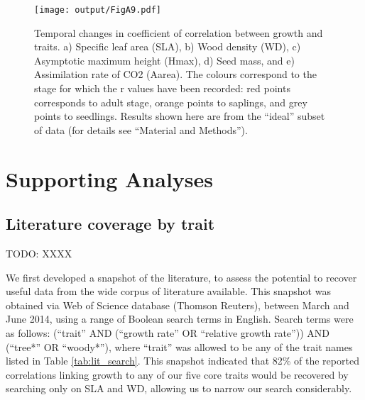 \documentclass[a4paper,11pt]{article}
\begin{document}
\begin{appendices}
\begin{figure}[h!]
\centering
\texttt{[image: output/FigA9.pdf]}
\caption{Temporal changes in coefficient of correlation between growth and traits. a) Specific leaf area (SLA), b) Wood density (WD), c) Asymptotic maximum height (Hmax), d) Seed mass, and e) Assimilation rate of CO2 (Aarea). The colours correspond to the stage for which the r values have been recorded: red points corresponds to adult stage, orange points to saplings, and grey points to seedlings. Results shown here are from the ``ideal'' subset of data (for details see ``Material and Methods'').}
\label{fig:figA9}
\end{figure}

\clearpage
\section{Supporting Analyses}\label{app:supp_info_analyses}

\subsection{Literature coverage by trait}\label{app:literature-snapshot}

TODO: XXXX

We first developed a snapshot of the literature, to assess the potential to recover useful data from the wide corpus of literature available. This snapshot was obtained via Web of Science database (Thomson Reuters), between March and June 2014, using a range of Boolean search terms in English. Search terms were as follows: (``trait'' AND (``growth rate'' OR ``relative growth rate'')) AND (``tree*'' OR ``woody*''), where ``trait'' was allowed to be any of the trait names listed in Table \ref{tab:lit_search}. This snapshot indicated that 82\% of the reported correlations linking growth to any of our five core traits would be recovered by searching only on SLA and WD, allowing us to narrow our search considerably.

\linespread{1}


\end{appendices}
\end{document}
